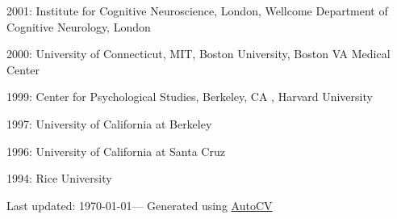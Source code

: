 \documentclass[10pt, letterpaper]{article}
\begin{document}
2001:  Institute for Cognitive Neuroscience, London,  Wellcome Department of Cognitive Neurology, London \vspace{2mm}

2000:  University of Connecticut, MIT, Boston University, Boston VA Medical Center \vspace{2mm}

1999:  Center for Psychological Studies, Berkeley, CA , Harvard University \vspace{2mm}

1997:  University of California at Berkeley  \vspace{2mm}

1996:  University of California at Santa Cruz  \vspace{2mm}

1994:  Rice University  \vspace{2mm}


\vfill{}
\hrulefill

\begin{center}
{\footnotesize Last updated: \today — Generated using \href{https://github.com/poldrack/autoCV}{AutoCV} 
}
\end{center}
\end{document}
